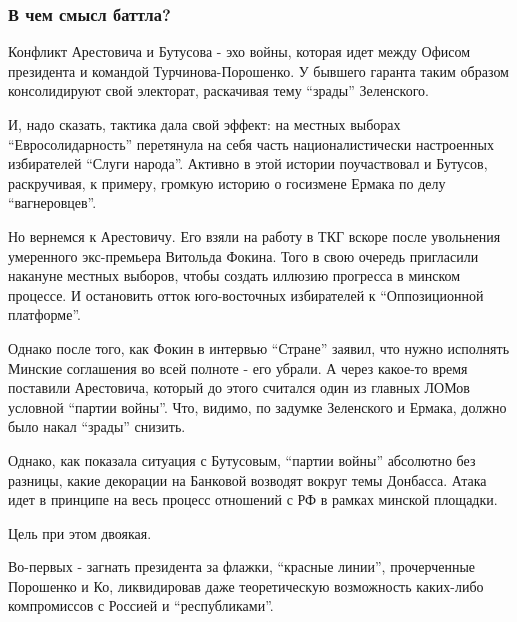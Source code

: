  
 
 

\subsubsection{В чем смысл баттла?}

Конфликт Арестовича и Бутусова - эхо войны, которая идет между Офисом
президента и командой Турчинова-Порошенко. У бывшего гаранта таким образом
консолидируют свой электорат, раскачивая тему \enquote{зрады} Зеленского.

И, надо сказать, тактика дала свой эффект: на местных выборах
\enquote{Евросолидарность} перетянула на себя часть националистически настроенных
избирателей \enquote{Слуги народа}. Активно в этой истории поучаствовал и Бутусов,
раскручивая, к примеру, громкую историю о госизмене Ермака по делу
\enquote{вагнеровцев}. 

Но вернемся к Арестовичу. Его взяли на работу в ТКГ вскоре после
увольнения умеренного экс-премьера Витольда Фокина. Того в свою очередь
пригласили накануне местных выборов, чтобы создать иллюзию прогресса в
минском процессе. И остановить отток юго-восточных избирателей к
\enquote{Оппозиционной платформе}. 

Однако после того, как Фокин в интервью \enquote{Стране}
заявил,
что нужно исполнять Минские соглашения во всей полноте - его убрали. А через
какое-то время поставили Арестовича, который до этого считался один из главных
ЛОМов условной \enquote{партии войны}. Что, видимо, по задумке Зеленского и Ермака,
должно было накал \enquote{зрады} снизить. 

Однако, как показала ситуация с Бутусовым, \enquote{партии войны} абсолютно без
разницы, какие декорации на Банковой возводят вокруг темы Донбасса. Атака
идет в принципе на весь процесс отношений с РФ в рамках минской площадки.

Цель при этом двоякая.

Во-первых - загнать президента за флажки, \enquote{красные линии}, прочерченные
Порошенко и Ко, ликвидировав даже теоретическую возможность каких-либо
компромиссов с Россией и \enquote{республиками}. 

